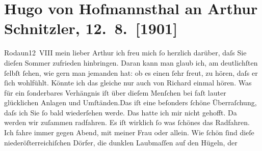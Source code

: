 

               \section[Hugo von Hofmannsthal an Arthur Schnitzler, 12. 8. {[}1901{]}]{ Hugo von Hofmannsthal an Arthur Schnitzler, 12. 8. {[}1901{]}}\nopagebreak{}\rehead{ }\begin{ledgroupsized}[t]{13cm}\normalsize\beginnumbering{} \toendnotes[C]{\smallbreak\pagebreak[2]} 
\toendnotes[C]{\smallbreak}\pstart
           \raggedleft{}{\pb}Rodaun12 VIII\pend
           \pstart{}mein lieber Arthur \pend\pstart
           ich freu mich ſo herzlich darüber, daſs Sie dieſen Sommer zufrieden hinbringen. Daran
               kann man glaub ich, am deutlichſten ſelbſt ſehen, wie gern man jemanden hat: ob es
               einen ſehr freut, zu hören, daſs er ſich wohlfühlt. Könnte ich das gleiche nur auch
               von Richard einmal hören. Was für ein ſonderbares
               Verhängnis iſt über dieſem Menſchen bei faſt lauter glücklichen Anlagen und
                  Umſtänden.\hspace*{1.5em}Das iſt {\pb}eine beſonders ſchöne
               Überraſchung, daſs ich Sie ſo bald wiederſehen werde. Das hatte ich mir nicht
               gehofft.\pend
           \pstart
           Da werden wir zuſammen radfahren. Es iſt wirklich ſo was ſchönes das Radfahren. Ich
               fahre immer gegen Abend, mit meiner Frau oder allein. Wie ſchön ſind dieſe niederöſterreichiſchen Dörfer, die dunklen Laubmaſſen auf den Hügeln, der

\end{ledgroupsized}
